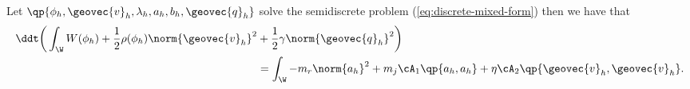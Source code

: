 \documentclass[final]{amsart}
\numberwithin{equation}{section}
\begin{document}
\begin{The}
  \label{the:spat-disc-energy}
  Let $\qp{\phi_h, {\geovec{v}}_h, \lambda_h, a_h, b_h, {\geovec{q}}_h}$ solve the
  semidiscrete problem (\ref{eq:discrete-mixed-form}) then we have
  that
  \begin{equation}
    \begin{split}
      \ddt 
      \bigg(\int_\W W(\phi_h) 
        +
        \frac{1}{2}\rho(\phi_h) \norm{{\geovec{v}}_h}^2
        & +
        \frac{1}{2}\gamma \norm{{\geovec{q}}_h}^2
      \bigg)
      \\
      &=
      \int_\W 
      - 
      m_r \norm{a_h}^2 
      +
      m_j
      \cA_1 \qp{a_h, a_h}
      +
      \eta \cA_2 \qp{{\geovec{v}}_h, {\geovec{v}}_h}.
    \end{split}
  \end{equation}
\end{The}
\end{document}

